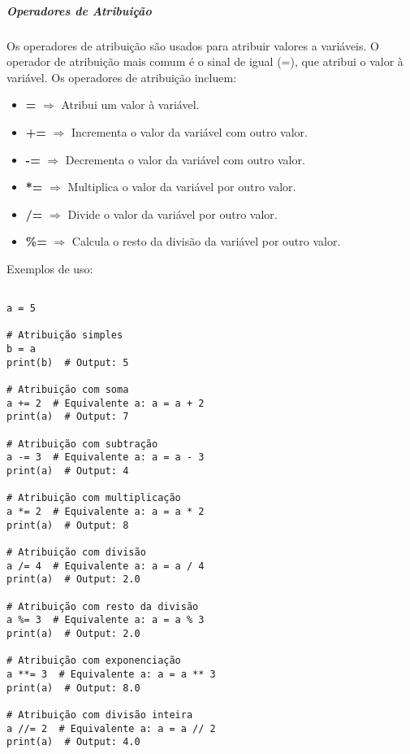 \documentclass[a4paper, 12pt, onecolumn,singlespacing]{article}
\begin{document}
\label{operadores_aritmeticos}

	\subparagraph{Operadores de Atribuição} 
	
	Os operadores de atribuição são usados para atribuir valores a variáveis. O operador de atribuição mais comum é o sinal de igual (=), que atribui o valor à variável. Os operadores de atribuição incluem:
	
	\begin{itemize}
		\item \textbf{=} $\Rightarrow$ Atribui um valor à variável.
		\item \textbf{+=} $\Rightarrow$ Incrementa o valor da variável com outro valor.
		\item \textbf{-=} $\Rightarrow$ Decrementa o valor da variável com outro valor.
		\item \textbf{*=} $\Rightarrow$ Multiplica o valor da variável por outro valor.
		\item \textbf{/=} $\Rightarrow$ Divide o valor da variável por outro valor.
		\item \textbf{\%=} $\Rightarrow$ Calcula o resto da divisão da variável por outro valor.
	\end{itemize}
	
	Exemplos de uso:

\begin{verbatim}

a = 5

# Atribuição simples
b = a
print(b)  # Output: 5

# Atribuição com soma
a += 2  # Equivalente a: a = a + 2
print(a)  # Output: 7

# Atribuição com subtração
a -= 3  # Equivalente a: a = a - 3
print(a)  # Output: 4

# Atribuição com multiplicação
a *= 2  # Equivalente a: a = a * 2
print(a)  # Output: 8
				
# Atribuição com divisão
a /= 4  # Equivalente a: a = a / 4
print(a)  # Output: 2.0

# Atribuição com resto da divisão
a %= 3  # Equivalente a: a = a % 3
print(a)  # Output: 2.0

# Atribuição com exponenciação
a **= 3  # Equivalente a: a = a ** 3
print(a)  # Output: 8.0

# Atribuição com divisão inteira
a //= 2  # Equivalente a: a = a // 2
print(a)  # Output: 4.0

\end{verbatim}
\label{operadores_de_atribuicao}
	
\end{document}

